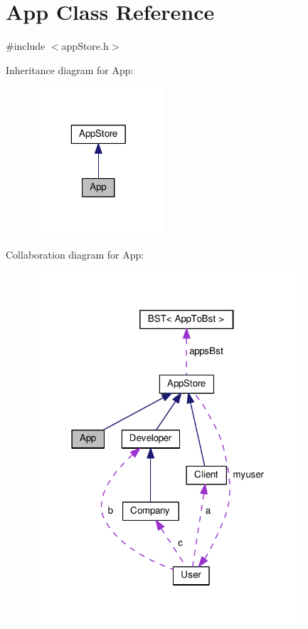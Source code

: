 \hypertarget{class_app}{\section{App Class Reference}
\label{class_app}
}


{\ttfamily \#include $<$app\-Store.\-h$>$}



Inheritance diagram for App\-:
\nopagebreak
\begin{figure}[H]
\begin{center}
\leavevmode
\includegraphics[width=136pt]{class_app__inherit__graph}
\end{center}
\end{figure}


Collaboration diagram for App\-:
\nopagebreak
\begin{figure}[H]
\begin{center}
\leavevmode
\includegraphics[width=283pt]{class_app__coll__graph}
\end{center}
\end{figure}
